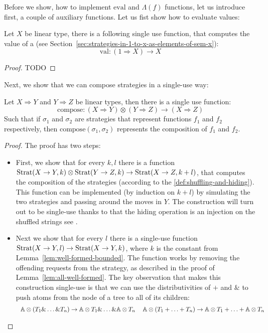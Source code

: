 Before we show, how to implement $\text{eval}$ and $\Lambda(f)$ functions, 
let us introduce first, a couple of auxiliary functions.
Let us fist show how to evaluate values:
\begin{lemma}
    Let $X$ be linear type, there is a following single use function, that 
    computes the value of a (see Section~\ref{sec:strategies-in-1-to-x-as-elements-of-sem-x}):
    \[\text{val}: (1 \Rightarrow X) \to X\]
\end{lemma}
\begin{proof}
    TODO 
\end{proof}

Next, we show that we can compose strategies in a single-use way:
\begin{lemma}
    Let $X \Rightarrow Y$ and $Y \Rightarrow Z$ be linear types, then there is a single use function:
    \[\text{compose} : (X \Rightarrow Y) \otimes (Y \Rightarrow Z) \to (X \Rightarrow Z)\]
    Such that if $\sigma_1$ and $\sigma_2$ are strategies that represent functions $f_1$ and $f_2$ respectively,
    then $\text{compose}(\sigma_1, \sigma_2)$ represents the composition of $f_1$ and $f_2$.
\end{lemma}
\begin{proof}
    The proof has two steps:
    \begin{itemize}
        \item First, we show that for every $k, l$ there is a function
              $\text{Strat}(X \to Y, k) \otimes \text{Strat}(Y \to Z, k) \to \text{Strat}(X \to Z, k + l)$, 
              that computes the composition of the strategies (according to the \ref{def:shuffling-and-hiding}). 
              This function can be implemented (by induction on $k + l$) by simulating the two strategies 
              and passing around the moves in $Y$. The construction will turn out to be single-use 
              thanks to that the hiding operation is an injection on 
              the shuffled strings see \cite[Covering Lemma]{abramsky2013semantics}.
        \item Next we show that for every $l$ there is a single-use function 
              $\text{Strat}(X \to Y, l) \to \text{Strat}(X \to Y, k)$, where $k$ is the 
              constant from Lemma~\ref{lem:well-formed-bounded}.
              The function works by removing the offending requests from the 
              strategy, as described in the proof of Lemma~\ref{lem:all-well-formed}. The key observation that makes this construction single-use is that we can use the 
              distributivities of $+$ and $\&$ to push atoms from the node 
              of a tree to all of its children:
              \[
                \begin{tabular}{cc}
                    $ \atoms \otimes (T_1 \& \ldots \& T_n) \to \atoms \otimes T_1 \& \ldots \& \atoms \otimes T_n$ & 
                    $ \atoms \otimes (T_1 +  \ldots + T_n) \to \atoms \otimes T_1 + \ldots + \atoms \otimes T_n$
                \end{tabular}
              \]

    \end{itemize}
\end{proof}


